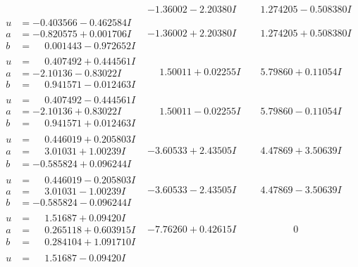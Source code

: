 \documentclass[1p]{elsarticle_modified}
\theoremstyle{definition}
\begin{document}
$$\begin{array}{c|c|c}
 & -1.36002 - 2.20380 I & \phantom{-}1.274205 - 0.508380 I \\ \hline\begin{aligned}
u &= -0.403566 - 0.462584 I \\
a &= -0.820575 + 0.001706 I \\
b &= \phantom{-}0.001443 - 0.972652 I\end{aligned}
 & -1.36002 + 2.20380 I & \phantom{-}1.274205 + 0.508380 I \\ \hline\begin{aligned}
u &= \phantom{-}0.407492 + 0.444561 I \\
a &= -2.10136 - 0.83022 I \\
b &= \phantom{-}0.941571 - 0.012463 I\end{aligned}
 & \phantom{-}1.50011 + 0.02255 I & \phantom{-}5.79860 + 0.11054 I \\ \hline\begin{aligned}
u &= \phantom{-}0.407492 - 0.444561 I \\
a &= -2.10136 + 0.83022 I \\
b &= \phantom{-}0.941571 + 0.012463 I\end{aligned}
 & \phantom{-}1.50011 - 0.02255 I & \phantom{-}5.79860 - 0.11054 I \\ \hline\begin{aligned}
u &= \phantom{-}0.446019 + 0.205803 I \\
a &= \phantom{-}3.01031 + 1.00239 I \\
b &= -0.585824 + 0.096244 I\end{aligned}
 & -3.60533 + 2.43505 I & \phantom{-}4.47869 + 3.50639 I \\ \hline\begin{aligned}
u &= \phantom{-}0.446019 - 0.205803 I \\
a &= \phantom{-}3.01031 - 1.00239 I \\
b &= -0.585824 - 0.096244 I\end{aligned}
 & -3.60533 - 2.43505 I & \phantom{-}4.47869 - 3.50639 I \\ \hline\begin{aligned}
u &= \phantom{-}1.51687 + 0.09420 I \\
a &= \phantom{-}0.265118 + 0.603915 I \\
b &= \phantom{-}0.284104 + 1.091710 I\end{aligned}
 & -7.76260 + 0.42615 I & \phantom{-0.000000 } 0 \\ \hline\begin{aligned}
u &= \phantom{-}1.51687 - 0.09420 I \\

\end{aligned}
\end{array}$$
\end{document}
